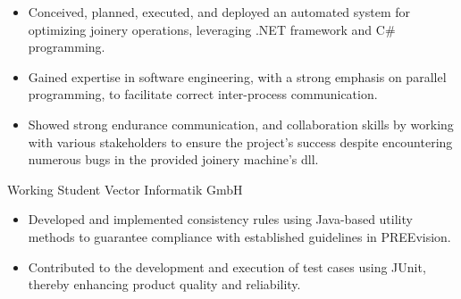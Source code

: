 \documentclass[11pt, letterpaper]{moderncv}
\newcommand{\de}[1]{}
\newcommand{\en}[1]{#1}
\newcommand{\de}[1]{#1}
\newcommand{\en}[1]{}
\begin{document}
        {\en{
        \begin{itemize}
            \item Conceived, planned, executed, and deployed an automated system for optimizing joinery operations, leveraging .NET framework and C\# programming.
            \item Gained expertise in software engineering, with a strong emphasis on parallel programming, to facilitate correct inter-process communication.
            \item Showed strong endurance communication, and collaboration skills by working with various stakeholders to ensure the project's success despite encountering numerous bugs in the provided joinery machine's dll.
        \end{itemize}}
        \de{
        \begin{itemize}
            \item Konzeption, Planung, Ausführung und Einsatz eines automatisierten Systems zur Optimierung von Abbundarbeiten unter Verwendung von .NET Framework und C\#-Programmierung
            \item Erlangung von Fachkenntnissen in der Softwareentwicklung mit Schwerpunkt auf paralleler Programmierung.
            \item Demonstration von Hartnäckigkeit, effektiver Kommunikations- und Kooperationsfähigkeiten durch die Zusammenarbeit mit verschiedenen Interessengruppen, um den Erfolg des Projekts zu gewährleisten.
        \end{itemize}}
        }
        {\en{Working Student}\de{Werkstudent}}
        {\en{Vector Informatik GmbH}\de{Vector Informatik GmbH}}
        {}
        {}
        {\en{
        \begin{itemize}%
            \item Developed and implemented consistency rules using Java-based utility methods to guarantee compliance with established guidelines in PREEvision.
            \item Contributed to the development and execution of test cases using JUnit, thereby enhancing product quality and reliability.
        \end{itemize}}
        \de{
        \begin{itemize}
            \item Entwicklung von Konsistenzregeln unter Verwendung von Java-basierten Dienstprogrammen, um die Einhaltung der festgelegten Richtlinien in der modellbasierten Entwicklungsumgebung PREEvision zu gewährleisten.
            \item Mitwirkung an der Entwicklung und Ausführung von Testfällen unter Verwendung von JUnit zur Verbesserung der Produktqualität und Zuverlässigkeit.
        \end{itemize}}
        }
\end{document}
